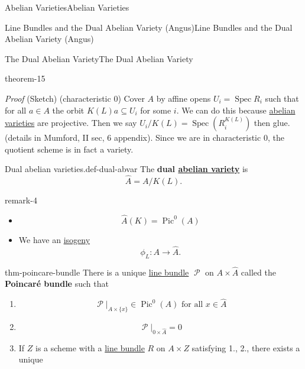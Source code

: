 \documentclass[10pt,]{book}
\makeatletter
\newcommand{\terminology}[1]{\textbf{#1}}
\renewcommand*{\proofname}{Proof}
\renewenvironment{proof}[1][\proofname]{\par
  \pushQED{\qed}%
  \normalfont \topsep6\p@\@plus6\p@\relax
  \trivlist
  \item\relax
    {\itshape
    #1\@addpunct{.}}\hspace\labelsep\ignorespaces
}{%
  \popQED\endtrivlist\@endpefalse
}
\numberwithin{equation}{section}
\newcommand{\sheaf}[1]{\operatorname{\mathcal{#1}}}
\DeclareMathOperator{\Pic}{Pic}
\DeclareMathOperator{\Spec}{Spec}
\makeatother
\begin{document}
\begin{chapterptx}{Abelian Varieties}{}{Abelian Varieties}{}{}
\begin{sectionptx}{Line Bundles and the Dual Abelian Variety (Angus)}{}{Line Bundles and the Dual Abelian Variety (Angus)}{}{}
\begin{subsectionptx}{The Dual Abelian Variety}{}{The Dual Abelian Variety}{}{}
\begin{theorem}{}{}{theorem-15}
\end{theorem}
\begin{proof}\hypertarget{proof-37}{}
\hypertarget{p-191}{}%
(Sketch) (characteristic 0) Cover \(A\) by affine opens \(U_i = \Spec R_i\) such that for all \(a \in A\) the orbit \(K(L)a \subseteq U_i\) for some \(i\). We can do this because \hyperref[def-buntes-abvar]{abelian varieties} are projective. Then we say \(U_i / K(L) = \Spec(R^{K(L)}_i)\) then glue. (details in Mumford, II sec, 6  appendix). Since we are in characteristic 0, the quotient scheme is in fact a variety.%
\end{proof}
\begin{definition}{Dual abelian varieties.}{def-dual-abvar}%
\hypertarget{p-192}{}%
The \terminology{dual \hyperref[def-buntes-abvar]{abelian variety}} is%
\begin{equation*}
\hat A = A/K(L)\text{.}
\end{equation*}
%
\end{definition}
\begin{remark}{}{remark-4}%
\hypertarget{p-193}{}%
\leavevmode%
\begin{itemize}[label=\textbullet]
\item{}%
\begin{equation*}
\hat A(K) = \Pic^0(A)
\end{equation*}
%
\item{}We have an \hyperref[def-supersing-isog-isog]{isogeny}%
\begin{equation*}
\phi_L\colon A \to \hat A\text{.}
\end{equation*}
%
\end{itemize}
%
\end{remark}
\begin{theorem}{}{}{thm-poincare-bundle}%
\hypertarget{p-194}{}%
There is a unique \hyperref[def-line-bundle]{line bundle} \(\sheaf P\) on \(A\times \hat A\) called the \terminology{Poincaré bundle} such that\leavevmode%
\begin{enumerate}
\item\hypertarget{li-35}{}%
\begin{equation*}
\sheaf P|_{A\times \{x\}} \in \Pic^0(A) \text{ for all }x\in \hat A
\end{equation*}
%
\item\hypertarget{li-36}{}%
\begin{equation*}
\sheaf P|_{0\times \hat A} = 0
\end{equation*}
%
\item\hypertarget{li-37}{}If \(Z\) is a  scheme with a \hyperref[def-line-bundle]{line bundle} \(R\) on \(A\times Z\) satisfying 1., 2., there exists a unique%

\end{enumerate}
\end{theorem}
\end{subsectionptx}
\end{sectionptx}
\end{chapterptx}
\end{document}
